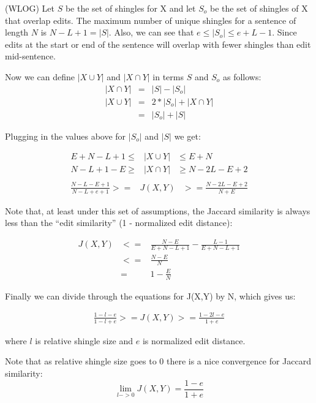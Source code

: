 \documentclass{acm_proc_article-sp}
\begin{document}
(WLOG) Let $S$ be the set of shingles for X and let $S_o$ be the set of shingles of X that overlap edits. The maximum number of unique shingles for a sentence of length $N$ is $N - L + 1 = |S|$. Also, we can see that $e \le |S_o| \le e + L - 1$. Since edits at the start or end of the sentence will overlap with fewer shingles than edit mid-sentence.

Now we can define $|X \cup Y|$ and $|X \cap Y|$ in terms $S$ and $S_o$ as follows:
\begin{eqnarray*}
|X \cap Y| & = & |S| - |S_o| \\
|X \cup Y| & = & 2*|S_o| + |X \cap Y| \\
           & = & |S_o| + |S|
\end{eqnarray*}

Plugging in the values above for $|S_o|$ and $|S|$ we get:

\begin{eqnarray*}
E + N - L + 1  \le & |X \cup Y| & \le E + N \\
N - L + 1 - E  \ge & |X \cap Y| & \ge N - 2L - E + 2 \\
\end{eqnarray*}
\begin{eqnarray*}
\frac{N - L - E + 1 }{N - L + e + 1} >= & J(X,Y) & >= \frac{N - 2L - E + 2}{N + E}
\end{eqnarray*}

Note that, at least under this set of assumptions, the Jaccard similarity is always less than the ``edit similarity'' (1 - normalized edit distance):

\begin{eqnarray*}
J(X,Y) & <= & \frac{N - E}{E + N - L + 1} - \frac{L - 1}{E + N - L + 1} \\
       & <= & \frac{N - E}{N} \\ 
       & =  & 1 - \frac{E}{N}
\end{eqnarray*}

Finally we can divide through the equations for J(X,Y) by N, which gives us:

\begin{eqnarray*}
\frac{1 - l - e}{1 - l + e} >= J(X,Y) >= \frac{1 - 2l - e}{1 + e}
\end{eqnarray*}

where $l$ is relative shingle size and $e$ is normalized edit distance.

Note that as relative shingle size goes to 0 there is a nice convergence for Jaccard similarity:
\[\lim_{l->0}J(X,Y) = \frac{1 - e}{1 + e}\]
\end{document}
